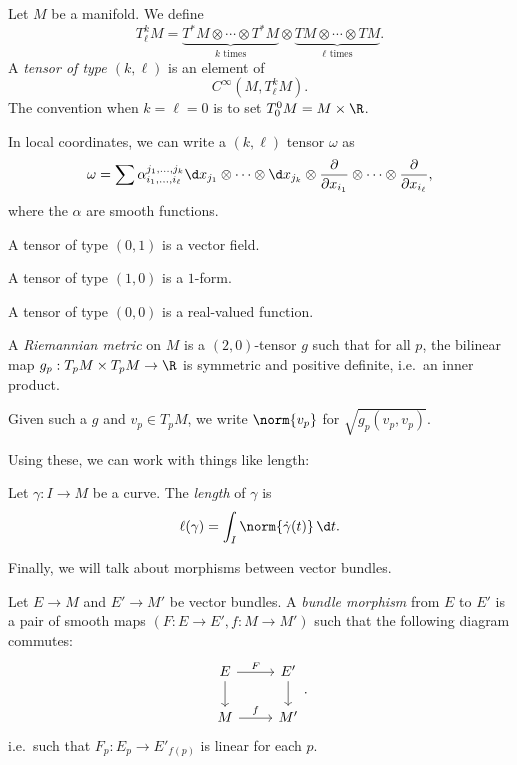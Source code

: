 \documentclass[a4paper]{article}
\begin{document}
\begin{defi}
  Let $M$ be a manifold. We define
  \[
    T_{\ell}^k M = \underbrace{T^*M \otimes \cdots \otimes T^* M}_{k \text{ times}} \otimes \underbrace{TM \otimes \cdots \otimes TM}_{\ell \text{ times}}.
  \]
  A \emph{tensor of type $(k, \ell)$} is an element of
  \[
    C^\infty (M, T_\ell^k M).
  \]
  The convention when $k = \ell = 0$ is to set $T_0^0 M = M \times \R$.
\end{defi}

In local coordinates, we can write a $(k, \ell)$ tensor $\omega$ as
\[
  \omega = \sum \alpha_{i_1, \ldots, i_\ell}^{j_1, \ldots, j_k} \d x_{j_1} \otimes \cdots \otimes \d x_{j_k} \otimes \frac{\partial}{\partial x_{i_1}} \otimes \cdots \otimes \frac{\partial}{\partial x_{i_\ell}},
\]
where the $\alpha$ are smooth functions.

\begin{eg}
  A tensor of type $(0, 1)$ is a vector field.

  A tensor of type $(1, 0)$ is a $1$-form.

  A tensor of type $(0, 0)$ is a real-valued function.
\end{eg}

\begin{defi}
  A \emph{Riemannian metric} on $M$ is a $(2, 0)$-tensor $g$ such that for all $p$, the bilinear map $g_p: T_p M \times T_p M \to \R$ is symmetric and positive definite, i.e.\ an inner product.

  Given such a $g$ and $v_p \in T_p M$, we write $\norm{v_p}$ for $\sqrt{g_p(v_p, v_p)}$.
\end{defi}

Using these, we can work with things like length:

\begin{defi}
  Let $\gamma: I \to M$ be a curve. The \emph{length} of $\gamma$ is
  \[
    \ell(\gamma)= \int_I \norm{\dot{\gamma}(t)} \,\d t.
  \]
\end{defi}

Finally, we will talk about morphisms between vector bundles.

\begin{defi}
  Let $E \to M$ and $E' \to M'$ be vector bundles. A \emph{bundle morphism} from $E$ to $E'$ is a pair of smooth maps $(F: E \to E', f: M \to M')$ such that the following diagram commutes:
  \[
    \begin{tikzcd}
      E \ar[d] \ar[r, "F"] & E' \ar[d]\\
      M \ar[r, "f"] & M'
    \end{tikzcd}.
  \]
  i.e.\ such that $F_p: E_p \to E'_{f(p)}$ is linear for each $p$.
\end{defi}
\end{document}

